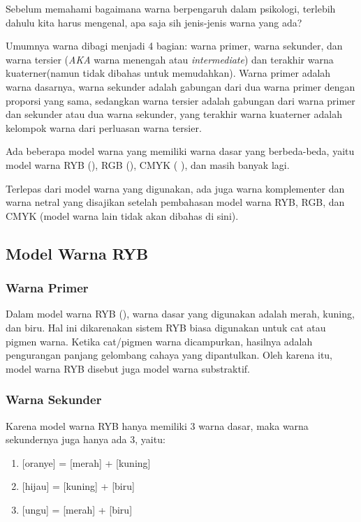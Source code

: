 \documentclass[a4paper,12pt]{article}
\newcommand{\warnalnbl}[1]{
  \tikz[baseline=-0.5\ht\strutbox]{
    \node[shape=rectangle, draw=black, fill=black, minimum height=1.5em, inner sep= 2pt, text=white]{#1}
  }
}
\begin{document}
Sebelum memahami bagaimana warna berpengaruh dalam psikologi, terlebih dahulu kita harus mengenal, apa saja sih jenis-jenis warna yang ada?

Umumnya warna dibagi menjadi 4 bagian: warna primer, warna sekunder, dan warna tersier (\textit{AKA} warna menengah atau \textit{intermediate}) dan terakhir warna kuaterner(namun tidak dibahas untuk memudahkan).
Warna primer adalah warna dasarnya, warna sekunder adalah gabungan dari dua warna primer dengan proporsi yang sama, sedangkan warna tersier adalah gabungan dari warna primer dan sekunder atau dua warna sekunder, yang terakhir warna kuaterner adalah kelompok warna dari perluasan warna tersier.

Ada beberapa model warna yang memiliki warna dasar yang berbeda-beda, yaitu model warna RYB (), RGB (), CMYK (\warnalnbl{Key/Black}), dan masih banyak lagi.

Terlepas dari model warna yang digunakan, ada juga warna komplementer dan warna netral yang disajikan setelah pembahasan model warna RYB, RGB, dan CMYK (model warna lain tidak akan dibahas di sini).

\subsection{Model Warna RYB}
\subsubsection{Warna Primer}
Dalam model warna RYB (), warna dasar yang digunakan adalah merah, kuning, dan biru. Hal ini dikarenakan sistem RYB biasa digunakan untuk cat atau pigmen warna. Ketika cat/pigmen warna dicampurkan, hasilnya adalah pengurangan panjang gelombang cahaya yang dipantulkan. Oleh karena itu, model warna RYB disebut juga model warna substraktif.

\subsubsection{Warna Sekunder}
Karena model warna RYB hanya memiliki 3 warna dasar, maka warna sekundernya juga hanya ada 3, yaitu:
\begin{enumerate}
  \item {}[oranye] = [merah] + [kuning]
  \item {}[hijau] = [kuning] + [biru]
  \item {}[ungu] = [merah] + [biru]
\end{enumerate}
\end{document}
